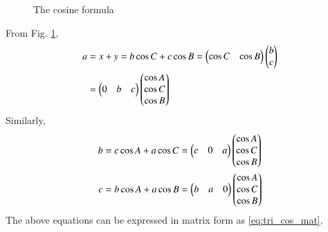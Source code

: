 \begin{enumerate}[label=\thesection.\arabic*.,ref=\thesection.\theenumi]
\begin{figure}[!ht]
\begin{center}
		\resizebox{\columnwidth}{!}{}
	\end{center}
	\caption{The cosine formula}
	\label{fig:tri_cosine_formula}	
\end{figure}
\solution From Fig. \ref{fig:tri_cosine_formula}, 
%
\begin{align}
	a &= x + y = b \cos C + c \cos B = \begin{pmatrix}  \cos C & \cos B \end{pmatrix} \begin{pmatrix} b \\ c \end{pmatrix}
	\\
&=\begin{pmatrix}0 & b & c \end{pmatrix} \begin{pmatrix} \cos A \\ \cos C \\ \cos B \end{pmatrix} 
\end{align}
%
Similarly,
%
\begin{align}
b &= c \cos A + a \cos C 
=\begin{pmatrix}c & 0 & a \end{pmatrix} \begin{pmatrix} \cos A \\ \cos C \\ \cos B \end{pmatrix} 
	\\
c &= b \cos A + a \cos B
=\begin{pmatrix}b & a & 0 \end{pmatrix} \begin{pmatrix} \cos A \\ \cos C \\ \cos B \end{pmatrix} 
\end{align}
%
The above equations can be expressed in matrix form as
\eqref{eq:tri_cos_mat}.


\end{enumerate}
